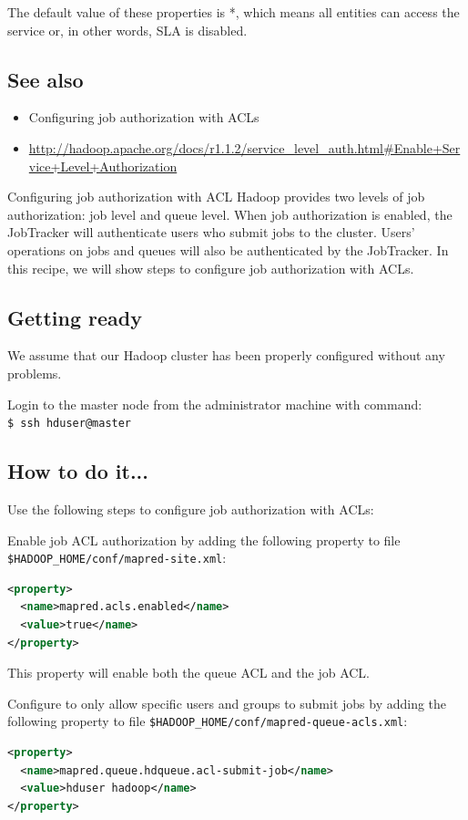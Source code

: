 The default value of these properties is *, which means all entities can access the service or, in other words, SLA is disabled.
\subsection*{See also}
\begin{itemize}
  \item Configuring job authorization with ACLs
  \item \url{http://hadoop.apache.org/docs/r1.1.2/service_level_auth.html#Enable+Service+Level+Authorization}
\end{itemize}

Configuring job authorization with ACL
Hadoop provides two levels of job authorization: job level and queue level. When job authorization is enabled, the JobTracker will authenticate users who submit jobs to the cluster. Users' operations on jobs and queues will also be authenticated by the JobTracker. In this recipe, we will show steps to configure job authorization with ACLs.
\subsection*{Getting ready}
We assume that our Hadoop cluster has been properly configured without any problems.

Login to the master node from the administrator machine with command: \\
\verb|$ ssh hduser@master|
\subsection*{How to do it...}
Use the following steps to configure job authorization with ACLs:

Enable job ACL authorization by adding the following property to file \verb|$HADOOP_HOME/conf/mapred-site.xml|:
\lstset{style=bashstyle}
\begin{lstlisting}[language=XML]
<property>
  <name>mapred.acls.enabled</name>
  <value>true</name>
</property>
\end{lstlisting}
This property will enable both the queue ACL and the job ACL.

Configure to only allow specific users and groups to submit jobs by adding the following property to file \verb|$HADOOP_HOME/conf/mapred-queue-acls.xml|:
\lstset{style=bashstyle}
\begin{lstlisting}[language=XML]
<property>
  <name>mapred.queue.hdqueue.acl-submit-job</name>
  <value>hduser hadoop</name>
</property>
\end{lstlisting}

